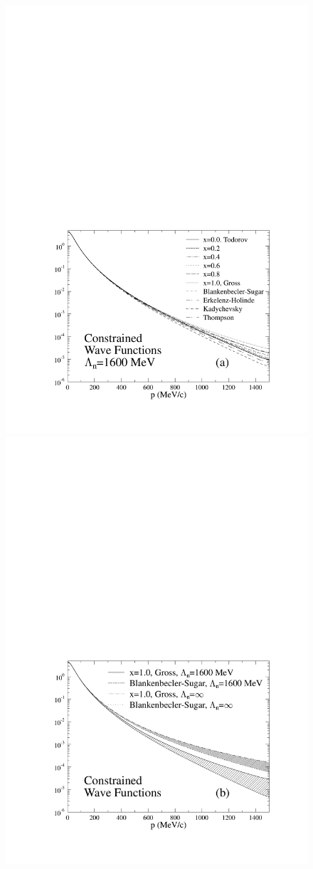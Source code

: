 \documentclass[mythesis.tex]{subfiles}
\begin{document}
\begin{figure}
\centerline{\includegraphics[width=4.5in]{graphics/wave_coup.pdf}}
\centerline{\includegraphics[width=4.5in]{graphics/wave_coup_infty.pdf}}

\end{figure}
\end{document}
